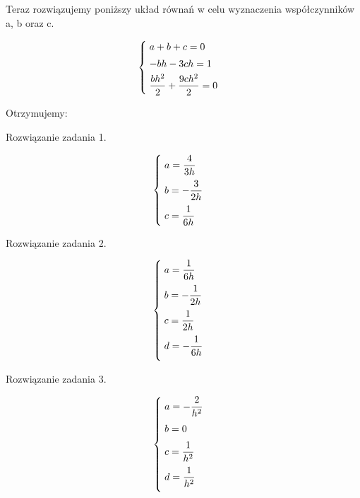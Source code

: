 Teraz rozwiązujemy poniższy układ równań w celu wyznaczenia współczynników a, b oraz c.

\[
\begin{cases}
\vspace{0.1cm} 
\hspace{0,1cm}a+b+c=0 \\
\vspace{0.1cm}
\hspace{0,1cm}-bh-3ch=1 \\
\hspace{0,1cm}\dfrac{bh^2}{2} + \dfrac{9ch^2}{2}=0
\end{cases}
\]

Otrzymujemy:

Rozwiązanie zadania 1.

\[
\begin{cases}
\vspace{0.2cm} 
\hspace{0,1cm}a=\dfrac{4}{3h} \\
\vspace{0.2cm}
\hspace{0,1cm}b=-\dfrac{3}{2h} \\
\hspace{0,1cm}c=\dfrac{1}{6h}
\end{cases}
\]

Rozwiązanie zadania 2.

\[
\begin{cases}
\vspace{0.2cm} 
\hspace{0,1cm}a=\dfrac{1}{6h} \\
\vspace{0.2cm}
\hspace{0,1cm}b=-\dfrac{1}{2h} \\
\vspace{0.2cm}
\hspace{0,1cm}c=\dfrac{1}{2h} \\
\vspace{0.2cm}
\hspace{0,1cm}d=-\dfrac{1}{6h}
\end{cases}
\]

Rozwiązanie zadania 3.

\[
\begin{cases}
\vspace{0.2cm} 
\hspace{0,1cm}a=-\dfrac{2}{h^2} \\
\vspace{0.2cm}
\hspace{0,1cm}b=0 \\
\vspace{0.2cm}
\hspace{0,1cm}c=\dfrac{1}{h^2} \\
\vspace{0.2cm}
\hspace{0,1cm}d=\dfrac{1}{h^2}
\end{cases}
\]


